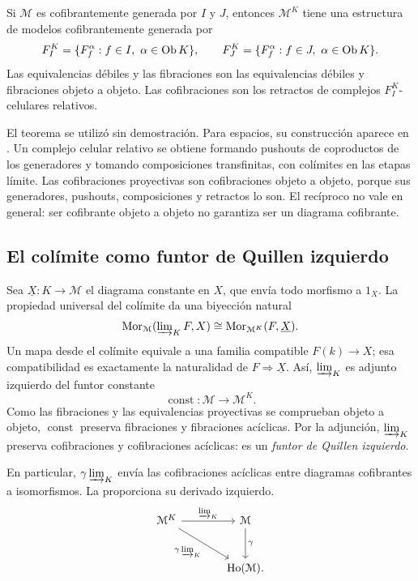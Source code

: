 \begin{teo}\label{teo:c15-modelos-proyectivos}
Si $\mathcal M$ es cofibrantemente generada por $I$ y $J$, entonces $\mathcal M^K$ tiene una estructura de modelos cofibrantemente generada por
\[
F_I^K=\{F_f^\alpha:f\in I,\ \alpha\in\ob K\},\qquad
F_J^K=\{F_f^\alpha:f\in J,\ \alpha\in\ob K\}.
\]
Las equivalencias débiles y las fibraciones son las equivalencias débiles y fibraciones objeto a objeto. Las cofibraciones son los retractos de complejos $F_I^K$-celulares relativos.
\end{teo}

El teorema se utilizó sin demostración. Para espacios, su construcción aparece en \cite[Sección~5.3]{malkiewich}. Un complejo celular relativo se obtiene formando pushouts de coproductos de los generadores y tomando composiciones transfinitas, con colímites en las etapas límite. Las cofibraciones proyectivas son cofibraciones objeto a objeto, porque sus generadores, pushouts, composiciones y retractos lo son. El recíproco no vale en general: ser cofibrante objeto a objeto no garantiza ser un diagrama cofibrante.

\subsection{El colímite como funtor de Quillen izquierdo}

Sea $\underline X\colon K\to\mathcal M$ el diagrama constante en $X$, que envía todo morfismo a $1_X$. La propiedad universal del colímite da una biyección natural
\[
\hom_{\mathcal M}(\varinjlim\nolimits_KF,X)\cong
\hom_{\mathcal M^K}(F,\underline X).
\]
Un mapa desde el colímite equivale a una familia compatible $F(k)\to X$; esa compatibilidad es exactamente la naturalidad de $F\Rightarrow\underline X$. Así, $\varinjlim\nolimits_K$ es adjunto izquierdo del funtor constante
\[
\operatorname{const}\colon\mathcal M\longrightarrow\mathcal M^K.
\]
Como las fibraciones y las equivalencias proyectivas se comprueban objeto a objeto, $\operatorname{const}$ preserva fibraciones y fibraciones acíclicas. Por la adjunción, $\varinjlim\nolimits_K$ preserva cofibraciones y cofibraciones acíclicas: es un \emph{funtor de Quillen izquierdo}.

En particular, $\gamma\varinjlim\nolimits_K$ envía las cofibraciones acíclicas entre diagramas cofibrantes a isomorfismos. La  proporciona su derivado izquierdo.
\[
\begin{tikzcd}[column sep=large,row sep=large]
\mathcal M^K \arrow[r,"\varinjlim\nolimits_K"] \arrow[dr,"\gamma\varinjlim\nolimits_K"']
& \mathcal M \arrow[d,"\gamma"]\\
& \Ho(\mathcal M).
\end{tikzcd}
\]

